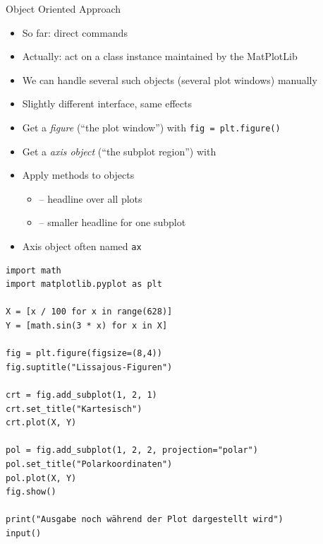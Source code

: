 \begin{frame}{Object Oriented Approach}
%
\begin{itemize}
\item So far: direct commands
\item Actually: act on a class instance maintained by the MatPlotLib
\item We can handle several such objects (several plot windows) manually
\item Slightly different interface, same effects
\item Get a \emph{figure} (\enquote{the plot window}) with \texttt{fig = plt.figure()}
\item Get a \emph{axis object} (\enquote{the subplot region}) with 
\item[\Thus] Apply methods to objects
	\begin{itemize}
	\item {} -- headline over all plots
	\item {} -- smaller headline for one subplot
	\end{itemize}
\item Axis object often named \texttt{ax}
\end{itemize}
%
\end{frame}


\begin{frame}[fragile]
%
\begin{codebox}
\begin{verbatim}
import math
import matplotlib.pyplot as plt

X = [x / 100 for x in range(628)]
Y = [math.sin(3 * x) for x in X]

fig = plt.figure(figsize=(8,4))
fig.suptitle("Lissajous-Figuren")

crt = fig.add_subplot(1, 2, 1)
crt.set_title("Kartesisch")
crt.plot(X, Y)

pol = fig.add_subplot(1, 2, 2, projection="polar")
pol.set_title("Polarkoordinaten")
pol.plot(X, Y)
fig.show()

print("Ausgabe noch während der Plot dargestellt wird")
input()
\end{verbatim}
\end{codebox}
%
\end{frame}

